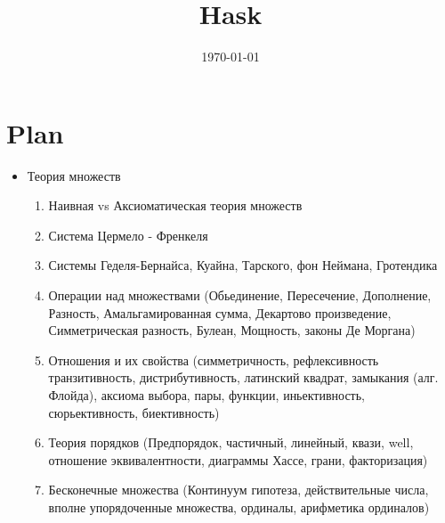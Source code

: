 \documentclass[10pt,a4paper]{article}
\date{\today}
\title{Hask}
\theoremstyle{definition}
\begin{document}
\maketitle
\newpage
{}

\section{Plan}
\begin{itemize}
\item Теория множеств
  \begin{enumerate}
  \item Наивная vs Аксиоматическая теория множеств
  \item Система Цермело - Френкеля
  \item Системы Геделя-Бернайса, Куайна, Тарского, фон Неймана, Гротендика
  \item Операции над множествами (Обьединение, Пересечение, Дополнение, Разность, Амальгамированная сумма, Декартово произведение, Симметрическая разность, Булеан, Мощность, законы Де Моргана)
  \item Отношения и их свойства (симметричность, рефлексивность транзитивность, дистрибутивность, латинский квадрат, замыкания (алг. Флойда), аксиома выбора, пары, функции, иньективность, сюрьективность, биективность)
  \item Теория порядков (Предпорядок, частичный, линейный, квази, well, отношение эквивалентности, диаграммы Хассе, грани, факторизация)
  \item Бесконечные множества (Континуум гипотеза, действительные числа, вполне упорядоченные множества, ординалы, арифметика ординалов)
    

\end{enumerate}
\end{itemize}
\end{document}
